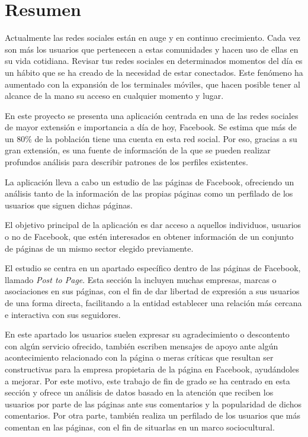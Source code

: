 \chapter{Resumen}

Actualmente las redes sociales están en auge y en continuo crecimiento. Cada vez son más los usuarios que pertenecen a estas comunidades y hacen uso de ellas en su vida cotidiana. Revisar tus redes sociales en determinados momentos del día es un hábito que se ha creado de la necesidad de estar conectados. Este fenómeno ha aumentado con la expansión de los terminales móviles, que hacen posible tener al alcance de la mano su acceso en cualquier momento y lugar. 

En este proyecto se presenta una aplicación centrada en una de las redes sociales de mayor extensión e importancia a día de hoy, Facebook. Se estima que más de un 80\% de la población tiene una cuenta en esta red social. Por eso, gracias a su gran extensión, es una fuente de información de la que se pueden realizar profundos análisis para describir patrones de los perfiles existentes.

La aplicación lleva a cabo un estudio de las páginas de Facebook, ofreciendo un análisis tanto de la información de las propias páginas como un perfilado de los usuarios que siguen dichas páginas. 

El objetivo principal de la aplicación es dar acceso a aquellos individuos, usuarios o no de Facebook, que estén interesados en obtener información de un conjunto de páginas de un mismo sector elegido previamente. 

El estudio se centra en un apartado específico dentro de las páginas de Facebook, llamado \textit{Post to Page}. Esta sección la incluyen muchas empresas, marcas o asociaciones en sus páginas, con el fin de dar libertad de expresión a sus usuarios de una forma directa, facilitando a la entidad establecer una relación más cercana e interactiva con sus seguidores.
 
En este apartado los usuarios suelen expresar su agradecimiento o descontento con algún servicio ofrecido, también escriben mensajes de apoyo ante algún acontecimiento relacionado con la página o meras críticas que resultan ser constructivas para la empresa propietaria de la página en Facebook, ayudándoles a mejorar. Por este motivo, este trabajo de fin de grado se ha centrado en esta sección y ofrece un análisis de datos basado en la atención que reciben los usuarios por parte de las páginas ante sus comentarios y la popularidad de dichos comentarios. Por otra parte, también realiza un perfilado de los usuarios que más comentan en las páginas, con el fin de situarlas en un marco sociocultural.  

